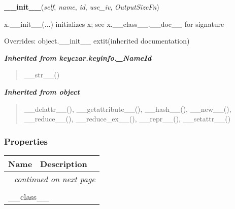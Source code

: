     \vspace{0.5ex}

\hspace{.8\funcindent}\begin{boxedminipage}{\funcwidth}

    \raggedright \textbf{\_\_init\_\_}(\textit{self}, \textit{name}, \textit{id}, \textit{use\_iv}, \textit{OutputSizeFn})

\setlength{\parskip}{2ex}
    x.\_\_init\_\_(...) initializes x; see x.\_\_class\_\_.\_\_doc\_\_ for 
    signature

\setlength{\parskip}{1ex}
      Overrides: object.\_\_init\_\_ 	extit{(inherited documentation)}

    \end{boxedminipage}


\large{\textbf{\textit{Inherited from keyczar.keyinfo.\_NameId}}}

\begin{quote}
\_\_str\_\_()
\end{quote}

\large{\textbf{\textit{Inherited from object}}}

\begin{quote}
\_\_delattr\_\_(), \_\_getattribute\_\_(), \_\_hash\_\_(), \_\_new\_\_(), \_\_reduce\_\_(), \_\_reduce\_ex\_\_(), \_\_repr\_\_(), \_\_setattr\_\_()
\end{quote}


  \subsubsection{Properties}

    \vspace{-1cm}
\hspace{\varindent}\begin{longtable}{|p{\varnamewidth}|p{\vardescrwidth}|l}
\cline{1-2}
\cline{1-2} \centering \textbf{Name} & \centering \textbf{Description}& \\
\cline{1-2}
\endhead\cline{1-2}\multicolumn{3}{r}{\small\textit{continued on next page}}\\\endfoot\cline{1-2}
\endlastfoot\multicolumn{2}{|l|}{\textit{Inherited from object}}\\
\multicolumn{2}{|p{\varwidth}|}{\raggedright \_\_class\_\_}\\
\cline{1-2}
\end{longtable}

